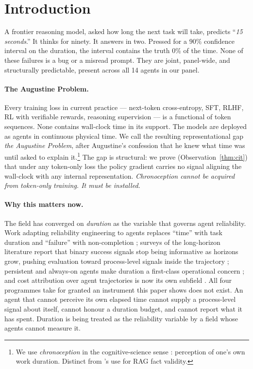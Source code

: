 
\section{Introduction}
\label{sec:intro}

A frontier reasoning model, asked how long the next task will take, predicts ``\textit{15 seconds}.'' It thinks for ninety. It answers in two. Pressed for a $90\%$ confidence interval on the duration, the interval contains the truth $0\%$ of the time. None of these failures is a bug or a misread prompt. They are joint, panel-wide, and structurally predictable, present across all 14 agents in our panel.

\paragraph{The Augustine Problem.}
Every training loss in current practice --- next-token cross-entropy, SFT, RLHF, RL with verifiable rewards, reasoning supervision --- is a functional of token sequences. None contains wall-clock time in its support. The models are deployed as agents in continuous physical time. We call the resulting representational gap \emph{the Augustine Problem}, after Augustine's confession that he knew what time was until asked to explain it.\footnote{We use \emph{chronoception} in the cognitive-science sense \citep{wittmann2009chronoception,eagleman2008time}: perception of one's own work duration. Distinct from \citet{goel2025chronocept}'s use for RAG fact validity.} The gap is structural: we prove (Observation~\ref{thm:cit}) that under any token-only loss the policy gradient carries no signal aligning the wall-clock with any internal representation. \emph{Chronoception cannot be acquired from token-only training. It must be installed.}

\paragraph{Why this matters now.} The field has converged on \emph{duration}
as the variable that governs agent reliability. Work adapting reliability
engineering to agents replaces ``time'' with task duration and ``failure'' with
non-completion \citep{khanal2026reliability}; surveys of the long-horizon
literature report that binary success signals stop being informative as
horizons grow, pushing evaluation toward process-level signals inside the
trajectory \citep{chen2026horizongap}; persistent and always-on agents make
duration a first-class operational concern \citep{ding2026alwayson}; and cost
attribution over agent trajectories is now its own subfield
\citep{liu2026costutility}. All four programmes take for granted an instrument
this paper shows does not exist. An agent that cannot perceive its own elapsed
time cannot supply a process-level signal about itself, cannot honour a
duration budget, and cannot report what it has spent. Duration is being treated
as the reliability variable by a field whose agents cannot measure it.

